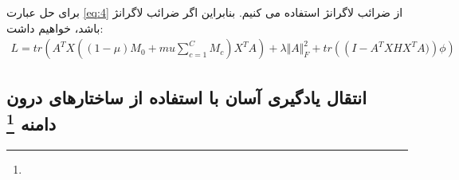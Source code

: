 {{{ 		    برای حل عبارت 
 		    \ref{eq:4}
 		    از ضرائب لاگرانژ استفاده می کنیم. بنابراین اگر ضرائب لاگرانژ باشد، خواهیم داشت: 
 		    \begin{equation}
 		    	\begin{aligned}
 		    	L = tr \left( A^{T}X \left( \left( 1 - \mu \right) M_{0} + mu \sum _{c=1\mathrm{ }}^{C}M_{c} \right) X^{T}A \right) + \lambda \Vert A \Vert_{F}^{2} + tr \left( \left( I -  A^{T}XHX^{T}A)\right) \phi \right) 
 		    	\label{eq:5}
 		    	\end{aligned}
 		    \end{equation}
 		 
 	}
	}

	
	
	
	
	\subsection{
		انتقال یادگیری آسان با استفاده از ساختارهای درون دامنه
		\protect \footnote{}
	}
}




